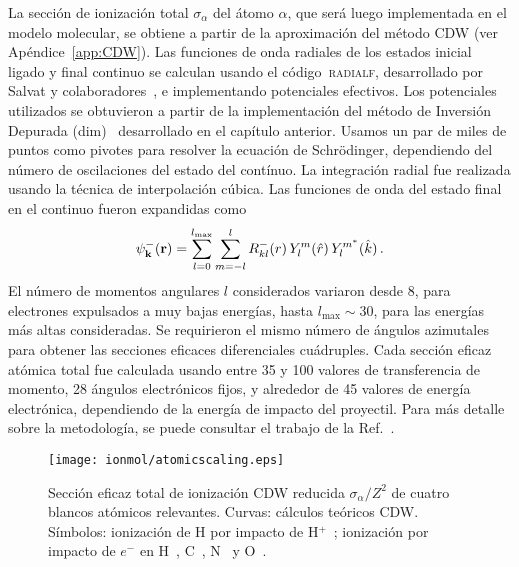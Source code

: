 La sección de ionización total $\sigma_{\alpha}$ del átomo $\alpha$, que 
será luego implementada en el modelo molecular, se obtiene a partir de la 
aproximación del método CDW (ver Apéndice~\ref{app:CDW}). Las 
funciones de onda radiales de los estados inicial ligado y final continuo 
se calculan usando el código~\textsc{radialf}, desarrollado por Salvat y 
colaboradores~\cite{salvat1995}, e implementando potenciales efectivos. 
Los potenciales utilizados se obtuvieron a partir de la implementación 
del método de Inversión Depurada (\acs{dim})~\cite{Mendez:16,Mendez:18} 
desarrollado en el capítulo anterior. Usamos un par de miles de puntos 
como pivotes para resolver la ecuación de Schr\"{o}dinger, dependiendo 
del número de oscilaciones del estado del contínuo. La integración radial 
fue realizada usando la técnica de interpolación cúbica. Las funciones de 
onda del estado final en el continuo fueron expandidas como
\begin{equation}
\psi_{\mbox{\scriptsize$\mathbf{k}$}}^-(\mathbf{r})=\sum_{l=0}^{l_{\max
}}\sum_{m=-l}^l R_{kl}^-(r)\,Y_l^m(\hat{r})\,Y_l^{m^*}
(\hat{k})\,.
\label{eq:contwave}
\end{equation}
El número de momentos angulares $l$ considerados variaron desde 8, para 
electrones expulsados a muy bajas energías, hasta $l_{\max}\sim 30$, para 
las energías más altas consideradas. Se requirieron el mismo número de 
ángulos azimutales para obtener las secciones eficaces diferenciales 
cuádruples. 
Cada sección eficaz atómica total fue calculada usando entre 35 y 100 
valores de transferencia de momento, 28 ángulos electrónicos fijos, y 
alrededor de 45 valores de energía electrónica, dependiendo de la energía 
de impacto del proyectil. Para más detalle sobre la metodología, se puede 
consultar el trabajo de la Ref.~\cite{Montanari:17-iongasesnobles}. 

\begin{figure}
\centering
\texttt{[image: ionmol/atomicscaling.eps]}
\caption[Sección eficaz total de ionización atómica CDW reducida.]
{Sección eficaz total de ionización CDW reducida $\sigma_{\alpha}/Z^2$ 
de cuatro blancos atómicos relevantes. Curvas: cálculos teóricos CDW. 
Símbolos: ionización de H por impacto de H$^+$~\cite{Shah:81}; ionización 
por impacto de $e^-$ en H~\cite{Shah:87}, C~\cite{Brook:78}, 
N~\cite{Brook:78} y O~\cite{Thompson:95}.}
\label{fig:atomscaling}
\end{figure} 

